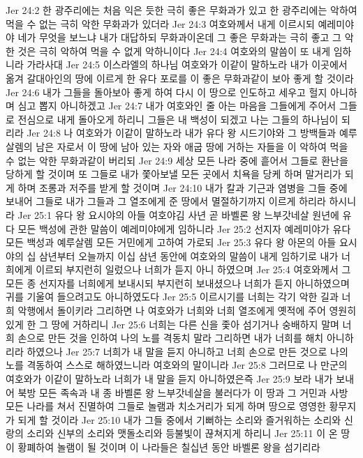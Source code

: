 Jer 24:2  한 광주리에는 처음 익은 듯한 극히 좋은 무화과가 있고 한 광주리에는 악하여 먹을 수 없는 극히 악한 무화과가 있더라
Jer 24:3  여호와께서 내게 이르시되 예레미야야 네가 무엇을 보느냐 내가 대답하되 무화과이온데 그 좋은 무화과는 극히 좋고 그 악한 것은 극히 악하여 먹을 수 없게 악하니이다
Jer 24:4  여호와의 말씀이 또 내게 임하니라 가라사대
Jer 24:5  이스라엘의 하나님 여호와가 이같이 말하노라 내가 이곳에서 옮겨 갈대아인의 땅에 이르게 한 유다 포로를 이 좋은 무화과같이 보아 좋게 할 것이라
Jer 24:6  내가 그들을 돌아보아 좋게 하여 다시 이 땅으로 인도하고 세우고 헐지 아니하며 심고 뽑지 아니하겠고
Jer 24:7  내가 여호와인 줄 아는 마음을 그들에게 주어서 그들로 전심으로 내게 돌아오게 하리니 그들은 내 백성이 되겠고 나는 그들의 하나님이 되리라
Jer 24:8  나 여호와가 이같이 말하노라 내가 유다 왕 시드기야와 그 방백들과 예루살렘의 남은 자로서 이 땅에 남아 있는 자와 애굽 땅에 거하는 자들을 이 악하여 먹을 수 없는 악한 무화과같이 버리되
Jer 24:9  세상 모든 나라 중에 흩어서 그들로 환난을 당하게 할 것이며 또 그들로 내가 쫓아보낼 모든 곳에서 치욕을 당케 하며 말거리가 되게 하며 조롱과 저주를 받게 할 것이며
Jer 24:10  내가 칼과 기근과 염병을 그들 중에 보내어 그들로 내가 그들과 그 열조에게 준 땅에서 멸절하기까지 이르게 하리라 하시니라
Jer 25:1  유다 왕 요시야의 아들 여호야김 사년 곧 바벨론 왕 느부갓네살 원년에 유다 모든 백성에 관한 말씀이 예레미야에게 임하니라
Jer 25:2  선지자 예레미야가 유다 모든 백성과 예루살렘 모든 거민에게 고하여 가로되
Jer 25:3  유다 왕 아몬의 아들 요시야의 십 삼년부터 오늘까지 이십 삼년 동안에 여호와의 말씀이 내게 임하기로 내가 너희에게 이르되 부지런히 일렀으나 너희가 듣지 아니 하였으며
Jer 25:4  여호와께서 그 모든 종 선지자를 너희에게 보내시되 부지런히 보내셨으나 너희가 듣지 아니하였으며 귀를 기울여 들으려고도 아니하였도다
Jer 25:5  이르시기를 너희는 각기 악한 길과 너희 악행에서 돌이키라 그리하면 나 여호와가 너희와 너희 열조에게 옛적에 주어 영원히 있게 한 그 땅에 거하리니
Jer 25:6  너희는 다른 신을 좇아 섬기거나 숭배하지 말며 너희 손으로 만든 것을 인하여 나의 노를 격동치 말라 그리하면 내가 너희를 해치 아니하리라 하였으나
Jer 25:7  너희가 내 말을 듣지 아니하고 너희 손으로 만든 것으로 나의 노를 격동하여 스스로 해하였느니라 여호와의 말이니라
Jer 25:8  그러므로 나 만군의 여호와가 이같이 말하노라 너희가 내 말을 듣지 아니하였은즉
Jer 25:9  보라 내가 보내어 북방 모든 족속과 내 종 바벨론 왕 느부갓네살을 불러다가 이 땅과 그 거민과 사방 모든 나라를 쳐서 진멸하여 그들로 놀램과 치소거리가 되게 하며 땅으로 영영한 황무지가 되게 할 것이라
Jer 25:10  내가 그들 중에서 기뻐하는 소리와 즐거워하는 소리와 신랑의 소리와 신부의 소리와 맷돌소리와 등불빛이 끊쳐지게 하리니
Jer 25:11  이 온 땅이 황폐하여 놀램이 될 것이며 이 나라들은 칠십년 동안 바벨론 왕을 섬기리라
